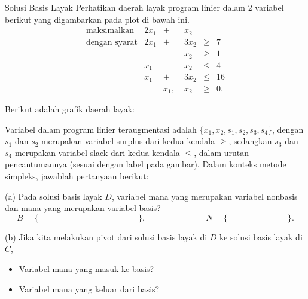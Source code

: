 \begin{ex}{Solusi Basis Layak}{}
\label{ex:bfs-graphical-pivot}
 Perhatikan daerah layak program linier dalam 2 variabel berikut yang digambarkan pada plot di bawah ini.   
$$
\begin{array}{rrrrrl}
\text{maksimalkan} & 2x_{1} & + & x_{2} \\
\text{dengan syarat} & 2x_{1} & + & 3x_{2} & \geq & 7 \\
& & & x_{2} & \geq & 1 \\
& x_{1} & - & x_{2} & \leq & 4 \\
& x_{1} & + & 3x_{2} & \leq & 16 \\
& & x_{1},\; & x_{2} & \geq & 0.
\end{array}
$$

Berikut adalah grafik daerah layak:
\begin{center}
\par{}\label{fig:desmos-graph-slacks}%

\end{center}

Variabel dalam program linier teraugmentasi adalah $\{x_1, x_2, s_1, s_2, s_3, s_4\}$, dengan $s_1$ dan $s_2$ merupakan variabel surplus dari kedua kendala $\geq$, sedangkan $s_3$ dan $s_4$ merupakan variabel slack dari kedua kendala $\leq$, dalam urutan pencantumannya (sesuai dengan label pada gambar).
Dalam konteks metode simpleks, jawablah pertanyaan berikut:

(a) Pada solusi basis layak $D$, variabel mana yang merupakan variabel nonbasis dan mana yang merupakan variabel basis?
$$
B = \big\{ \hspace{5cm} \big\}, \hspace{3cm}  N = \big\{ \hspace{3cm} \big\}. 
$$

(b) Jika kita melakukan pivot dari solusi basis layak di $D$ ke solusi basis layak di $C$,
\begin{itemize}
\item Variabel mana yang masuk ke basis?\\
\item Variabel mana yang keluar dari basis?
\end{itemize}
\end{ex}

